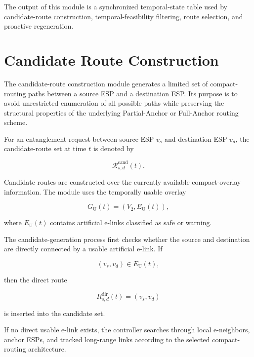 The output of this module is a synchronized temporal-state table used by candidate-route construction, temporal-feasibility filtering, route selection, and proactive regeneration.
\section{Candidate Route Construction}

The candidate-route construction module generates a limited set of compact-routing paths between a source ESP and a destination ESP. Its purpose is to avoid unrestricted enumeration of all possible paths while preserving the structural properties of the underlying Partial-Anchor or Full-Anchor routing scheme.

For an entanglement request between source ESP $v_s$ and destination ESP $v_d$, the candidate-route set at time $t$ is denoted by

\begin{equation}
    \mathcal{R}_{s,d}^{\mathrm{cand}}(t).
\end{equation}

Candidate routes are constructed over the currently available compact-overlay information. The module uses the temporally usable overlay

\begin{equation}
    G_{\mathrm{U}}(t)
    =
    \left(
    V_2,
    E_{\mathrm{U}}(t)
    \right),
\end{equation}

where $E_{\mathrm{U}}(t)$ contains artificial e-links classified as safe or warning.

The candidate-generation process first checks whether the source and destination are directly connected by a usable artificial e-link. If

\begin{equation}
    (v_s,v_d)
    \in
    E_{\mathrm{U}}(t),
\end{equation}

then the direct route

\begin{equation}
    R_{s,d}^{\mathrm{dir}}(t)
    =
    \left(
    v_s,
    v_d
    \right)
\end{equation}

is inserted into the candidate set.

If no direct usable e-link exists, the controller searches through local e-neighbors, anchor ESPs, and tracked long-range links according to the selected compact-routing architecture.

